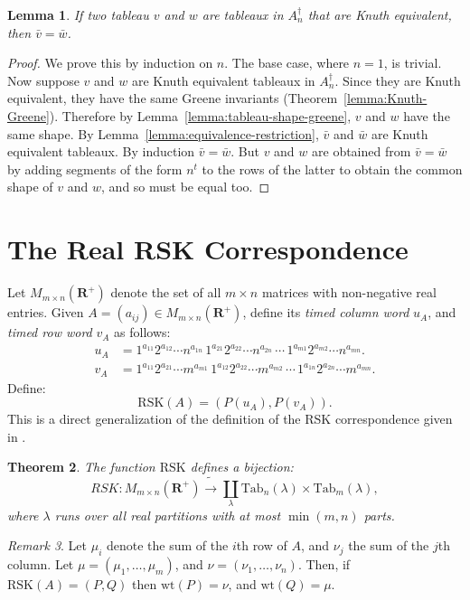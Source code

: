 \documentclass[10pt]{amsproc}
\newtheorem{theorem}{Theorem}[subsection]
\newtheorem{lemma}[theorem]{Lemma}
\theoremstyle{definition}
\theoremstyle{remark}
\newtheorem{remark}[theorem]{Remark}
\newcommand{\Tab}{\mathrm{Tab}}
\newcommand{\wt}{\mathrm{wt}}
\newcommand{\rp}{\mathbf{R}^+}
\newcommand{\rsk}{\mathrm{RSK}}
\begin{document}
\begin{lemma}
  If two tableau $v$ and $w$ are tableaux in $A_n^\dagger$ that are Knuth equivalent, then $\bar v = \bar w$.
\end{lemma}
\begin{proof}
  We prove this by induction on $n$.
  The base case, where $n=1$, is trivial.
  Now suppose $v$ and $w$ are Knuth equivalent tableaux in $A_n^\dagger$.
  Since they are Knuth equivalent, they have the same Greene invariants (Theorem~\ref{lemma:Knuth-Greene}).
  Therefore by Lemma~\ref{lemma:tableau-shape-greene}, $v$ and  $w$ have the same shape.
  By Lemma~\ref{lemma:equivalence-restriction}, $\bar v$ and $\bar w$ are Knuth equivalent tableaux.
  By induction $\bar v= \bar w$.
  But $v$ and $w$ are obtained from $\bar v=\bar w$ by adding segments of the form $n^t$ to the rows of the latter to obtain the common shape of $v$ and $w$, and so must be equal too.
\end{proof}

\section{The Real RSK Correspondence}
\label{sec:rsk}

Let $M_{m\times n}(\rp)$ denote the set of all $m\times n$ matrices with non-negative real entries.
Given $A=(a_{ij})\in M_{m\times n}(\rp)$, define its \emph{timed column word} $u_A$, and \emph{timed row word} $v_A$ as follows:
\begin{align*}
  u_A & = 1^{a_{11}}2^{a_{12}}\dotsb n^{a_{1n}}\,1^{a_{21}}2^{a_{22}}\dotsb n^{a_{2n}}\,\dotsb \,1^{a_{m1}}2^{a_{m2}}\dotsb n^{a_{mn}}.\\
  v_A & = 1^{a_{11}}2^{a_{21}}\dotsb m^{a_{m1}}\,1^{a_{12}}2^{a_{22}}\dotsb m^{a_{m2}}\,\dotsb \,1^{a_{1n}}2^{a_{2n}}\dotsb m^{a_{mn}}.
\end{align*}
Define:
\begin{equation}
  \label{eq:rsk}
  \rsk(A) = (P(u_A), P(v_A)).
\end{equation}
This is a direct generalization of the definition of the RSK correspondence given in \cite[Section~18]{schur_poly}.

\begin{theorem}
  The function $\rsk$ defines a bijection:
  \begin{displaymath}
    RSK: M_{m\times n}(\rp)\tilde\to \coprod_\lambda \Tab_n(\lambda)\times\Tab_m(\lambda),
  \end{displaymath}
  where $\lambda$ runs over all real partitions with at most $\min(m,n)$ parts.
\end{theorem}
\begin{remark}
  Let $\mu_i$ denote the sum of the $i$th row of $A$, and $\nu_j$ the sum of the $j$th column.
  Let $\mu=(\mu_1,\dotsc,\mu_m)$, and $\nu=(\nu_1,\dotsc,\nu_n)$.
  Then, if $\rsk(A)=(P,Q)$ then $\wt(P)=\nu$, and $\wt(Q)=\mu$.
\end{remark}


\end{document}
